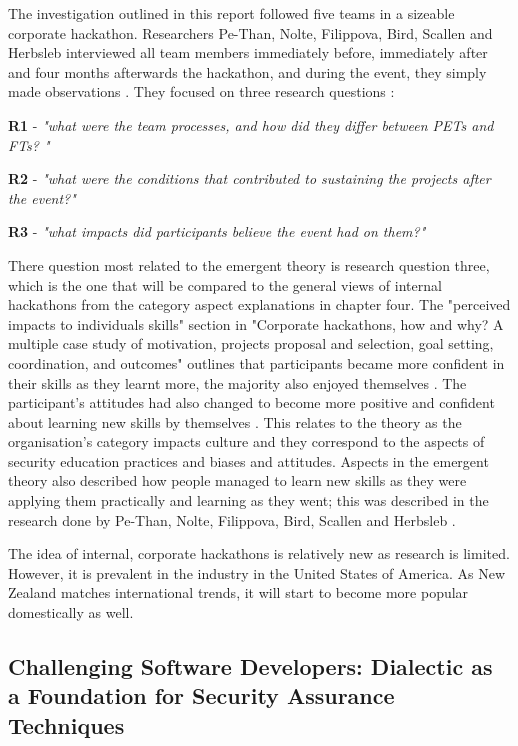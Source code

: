 The investigation outlined in this report followed five teams in a sizeable corporate hackathon. Researchers  Pe-Than,  Nolte, Filippova, Bird, Scallen and Herbsleb interviewed all team members immediately before, immediately after and four months afterwards the hackathon, and during the event, they simply made observations \cite{corp}. They focused on three research questions \cite{corp}:
\newline
\par
\textbf{R1} - \textit{"what were the team processes, and how did they differ between PETs and FTs?  "}
\newline
\par
\textbf{R2} - \textit{"what were the conditions that contributed to sustaining the projects after the event?"}
\newline
\par
\textbf{R3} - \textit{"what impacts did participants believe the event had on them?"}
\newline
\par
There question most related to the emergent theory is research question three, which is the one that will be compared to the general views of internal hackathons from the category aspect explanations in chapter four. The "perceived impacts to individuals skills" section in "Corporate hackathons, how and why? A multiple case study of motivation, projects proposal and selection, goal setting, coordination, and outcomes" outlines that participants became more confident in their skills as they learnt more, the majority also enjoyed themselves \cite{corp}. The participant's attitudes had also changed to become more positive and confident about learning new skills by themselves \cite{corp}. This relates to the theory as the organisation's category impacts culture and they correspond to the aspects of security education practices and biases and attitudes. Aspects in the emergent theory also described how people managed to learn new skills as they were applying them practically and learning as they went; this was described in the research done by Pe-Than,  Nolte, Filippova, Bird, Scallen and Herbsleb \cite{corp}.
\newline
\par
The idea of internal, corporate hackathons is relatively new as research is limited. However, it is prevalent in the industry in the United States of America. As New Zealand matches international trends, it will start to become more popular domestically as well. 

\subsection{Challenging Software Developers: Dialectic as a Foundation for Security Assurance Techniques}

